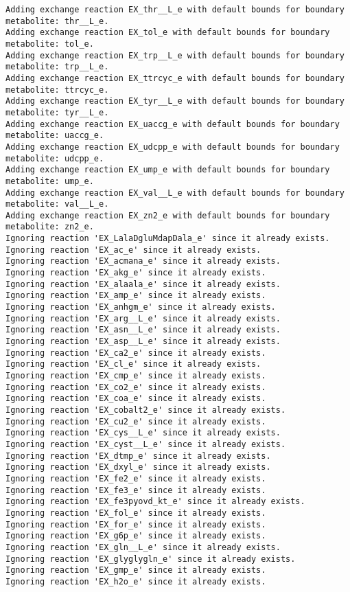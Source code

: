 \documentclass[
  letterpaper,
  DIV=11,
  numbers=noendperiod]{scrartcl}
\begin{document}
\begin{verbatim}
Adding exchange reaction EX_thr__L_e with default bounds for boundary metabolite: thr__L_e.
Adding exchange reaction EX_tol_e with default bounds for boundary metabolite: tol_e.
Adding exchange reaction EX_trp__L_e with default bounds for boundary metabolite: trp__L_e.
Adding exchange reaction EX_ttrcyc_e with default bounds for boundary metabolite: ttrcyc_e.
Adding exchange reaction EX_tyr__L_e with default bounds for boundary metabolite: tyr__L_e.
Adding exchange reaction EX_uaccg_e with default bounds for boundary metabolite: uaccg_e.
Adding exchange reaction EX_udcpp_e with default bounds for boundary metabolite: udcpp_e.
Adding exchange reaction EX_ump_e with default bounds for boundary metabolite: ump_e.
Adding exchange reaction EX_val__L_e with default bounds for boundary metabolite: val__L_e.
Adding exchange reaction EX_zn2_e with default bounds for boundary metabolite: zn2_e.
Ignoring reaction 'EX_LalaDgluMdapDala_e' since it already exists.
Ignoring reaction 'EX_ac_e' since it already exists.
Ignoring reaction 'EX_acmana_e' since it already exists.
Ignoring reaction 'EX_akg_e' since it already exists.
Ignoring reaction 'EX_alaala_e' since it already exists.
Ignoring reaction 'EX_amp_e' since it already exists.
Ignoring reaction 'EX_anhgm_e' since it already exists.
Ignoring reaction 'EX_arg__L_e' since it already exists.
Ignoring reaction 'EX_asn__L_e' since it already exists.
Ignoring reaction 'EX_asp__L_e' since it already exists.
Ignoring reaction 'EX_ca2_e' since it already exists.
Ignoring reaction 'EX_cl_e' since it already exists.
Ignoring reaction 'EX_cmp_e' since it already exists.
Ignoring reaction 'EX_co2_e' since it already exists.
Ignoring reaction 'EX_coa_e' since it already exists.
Ignoring reaction 'EX_cobalt2_e' since it already exists.
Ignoring reaction 'EX_cu2_e' since it already exists.
Ignoring reaction 'EX_cys__L_e' since it already exists.
Ignoring reaction 'EX_cyst__L_e' since it already exists.
Ignoring reaction 'EX_dtmp_e' since it already exists.
Ignoring reaction 'EX_dxyl_e' since it already exists.
Ignoring reaction 'EX_fe2_e' since it already exists.
Ignoring reaction 'EX_fe3_e' since it already exists.
Ignoring reaction 'EX_fe3pyovd_kt_e' since it already exists.
Ignoring reaction 'EX_fol_e' since it already exists.
Ignoring reaction 'EX_for_e' since it already exists.
Ignoring reaction 'EX_g6p_e' since it already exists.
Ignoring reaction 'EX_gln__L_e' since it already exists.
Ignoring reaction 'EX_glyglygln_e' since it already exists.
Ignoring reaction 'EX_gmp_e' since it already exists.
Ignoring reaction 'EX_h2o_e' since it already exists.

\end{verbatim}
\end{document}
